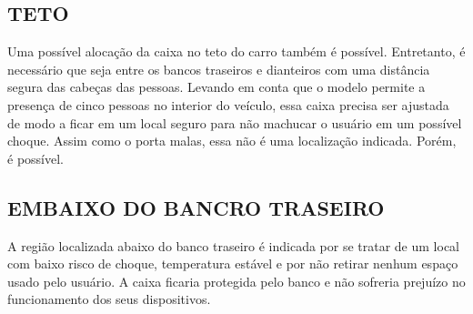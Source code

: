 \subsection{TETO}
Uma possível alocação da caixa no teto do carro também é possível. Entretanto, é necessário que seja entre os bancos traseiros e dianteiros com uma distância segura das cabeças das pessoas. Levando em conta que o modelo permite a presença de cinco pessoas no interior do veículo, essa caixa precisa ser ajustada de modo a ficar em um local seguro para não machucar o usuário em um possível choque. Assim como o porta malas, essa não é uma localização indicada. Porém, é possível.
\subsection{EMBAIXO DO BANCRO TRASEIRO}
A região localizada abaixo do banco traseiro é indicada por se tratar de um local com baixo risco de choque, temperatura estável e por não retirar nenhum espaço usado pelo usuário. A caixa ficaria protegida pelo banco e não sofreria prejuízo no funcionamento dos seus dispositivos.
